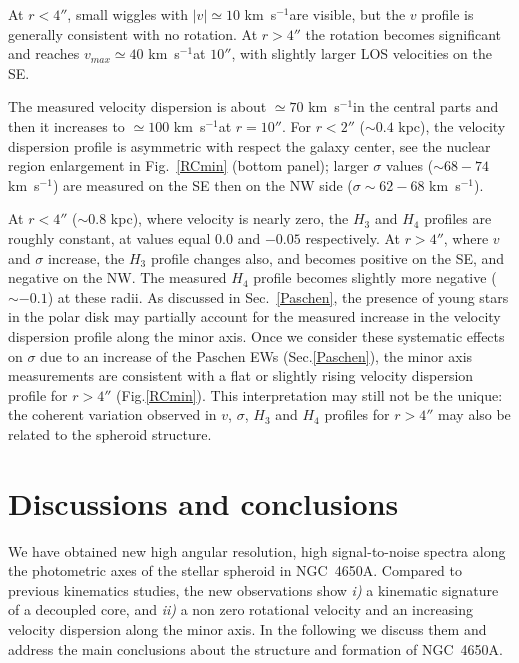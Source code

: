 \documentclass[12pt,preprint]{aastex}
\newcommand{\kms}{\mbox{km~s$^{-1}$}}
\begin{document}
At $r < 4''$, small wiggles with $|v| \simeq 10$ \kms are
visible, but the $v$ profile is generally consistent with no
rotation. At $r > 4''$ the rotation becomes significant and reaches
$v_{max} \simeq 40$ \kms at $10''$, with slightly larger LOS velocities
on the SE.

The measured velocity dispersion is about $\simeq 70$ \kms in the
central parts and then it increases to $\simeq 100$ \kms at $r =
10''$. For $r < 2''$ ($\sim 0.4$ kpc), the velocity dispersion profile
is asymmetric with respect the galaxy center, see the nuclear region
enlargement in Fig.~\ref{RCmin} (bottom panel); larger $\sigma$ values
($ \sim 68 - 74$ \kms) are measured on the SE then on the NW side
($\sigma \sim 62 - 68$
\kms). 

At $r < 4''$ ($\sim 0.8$ kpc), where velocity is nearly zero, the
$H_3$ and $H_4$ profiles are roughly constant, at values equal $0.0$
and $-0.05$ respectively. At $r > 4''$, where $v$ and $\sigma$
increase, the $H_3$ profile changes also, and becomes positive on the
SE, and negative on the NW. The measured $H_4$ profile becomes
slightly more negative ($\sim -0.1$) at these radii. As discussed in
Sec.~\ref{Paschen}, the presence of young stars in the polar disk may
partially account for the measured increase in the velocity
dispersion profile along the minor axis. Once we consider these
systematic effects on $\sigma$ due to an increase of the Paschen EWs
(Sec.\ref{Paschen}), the minor axis measurements are consistent with a
flat or slightly rising velocity dispersion profile for $r > 4''$
(Fig.\ref{RCmin}). This interpretation may still not be the unique:
the coherent variation observed in $v$, $\sigma$, $H_3$ and $H_4$
profiles for $r>4''$ may also be related to the spheroid structure.


\section{Discussions and conclusions}\label{conclu}

We have obtained new high angular resolution, high signal-to-noise
spectra along the photometric axes of the stellar spheroid in
NGC~4650A. Compared to previous kinematics studies, the new
observations show {\it i)} a kinematic signature of a decoupled core,
and {\it ii)} a non zero rotational velocity and an increasing
velocity dispersion along the minor axis.  In the following we discuss
them and address the main conclusions about the structure and
formation of NGC~4650A.
\end{document}
